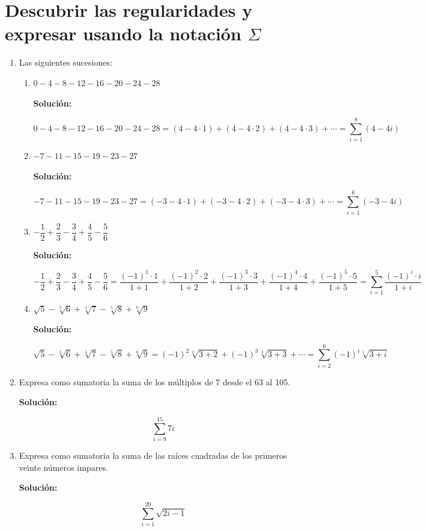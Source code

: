\documentclass[12pt]{article}
\newcommand{\solucion}{%
    \vspace{0.8em}%
    \textbf{Solución:}%
}
\begin{document}
\section{Descubrir las regularidades y expresar usando la notación $\Sigma$}

\begin{enumerate}[label=\alph*.-]
    \item Las siguientes sucesiones:
    \begin{enumerate}[label=\roman*.-]
        \item $0 - 4 - 8 - 12 - 16 - 20 - 24 - 28$

        \solucion
        \[
        0-4-8-12-16-20-24-28 = (4-4\cdot1)+(4-4\cdot2)+(4-4\cdot3)+\cdots
        = \sum_{i=1}^{8}(4-4i)
        \]

        \item $-7 - 11 - 15 - 19 - 23 - 27$

        \solucion
        \[
        -7-11-15-19-23-27 = (-3-4\cdot1)+(-3-4\cdot2)+(-3-4\cdot3)+\cdots
        = \sum_{i=1}^{6}(-3-4i)
        \]

        \item $-\dfrac{1}{2}+\dfrac{2}{3}-\dfrac{3}{4}+\dfrac{4}{5}-\dfrac{5}{6}$

        \solucion
        \[
        -\frac{1}{2}+\frac{2}{3}-\frac{3}{4}+\frac{4}{5}-\frac{5}{6}
        = \frac{(-1)^1\cdot1}{1+1}+\frac{(-1)^2\cdot2}{1+2}+\frac{(-1)^3\cdot3}{1+3}+\frac{(-1)^4\cdot4}{1+4}+\frac{(-1)^5\cdot5}{1+5}
        = \sum_{i=1}^{5}\frac{(-1)^i\cdot i}{1+i}
        \]

        \item $\sqrt{5}-\sqrt[3]{6}+\sqrt[4]{7}-\sqrt[5]{8}+\sqrt[6]{9}$

        \solucion
        \[
        \sqrt{5}-\sqrt[3]{6}+\sqrt[4]{7}-\sqrt[5]{8}+\sqrt[6]{9}
        = (-1)^2\sqrt[2]{3+2}+(-1)^3\sqrt[3]{3+3}+\cdots
        = \sum_{i=2}^{6}(-1)^{i}\sqrt[i]{3+i}
        \]

    \end{enumerate}

    \item Expresa como sumatoria la suma de los múltiplos de 7 desde el 63 al 105.

    \solucion
    \[
    \sum_{i=9}^{15} 7i
    \]

    \item Expresa como sumatoria la suma de las raíces cuadradas de los primeros veinte números impares.

    \solucion
    \[
    \sum_{i=1}^{20}\sqrt{2i-1}
    \]

\end{enumerate}
\end{document}
